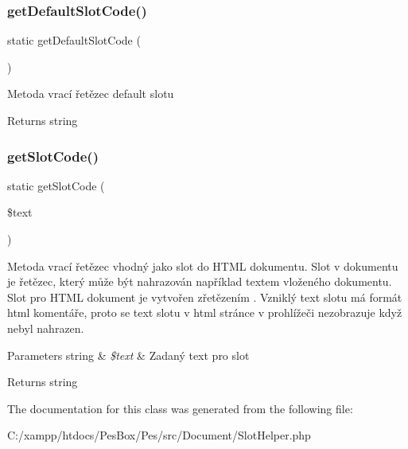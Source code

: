 \subsubsection{\texorpdfstring{get\+Default\+Slot\+Code()}{getDefaultSlotCode()}}
{\footnotesize\ttfamily static get\+Default\+Slot\+Code (\begin{DoxyParamCaption}{ }\end{DoxyParamCaption})\hspace{0.3cm}{\ttfamily [static]}}

Metoda vrací řetězec default slotu \begin{DoxyReturn}{Returns}
string 
\end{DoxyReturn}
\mbox{\label{class_pes_1_1_document_1_1_slot_helper_a6405a07adfaf197e36dd6fa9730d410d}} 
\subsubsection{\texorpdfstring{get\+Slot\+Code()}{getSlotCode()}}
{\footnotesize\ttfamily static get\+Slot\+Code (\begin{DoxyParamCaption}\item[{}]{\$text }\end{DoxyParamCaption})\hspace{0.3cm}{\ttfamily [static]}}

Metoda vrací řetězec vhodný jako slot do H\+T\+ML dokumentu. Slot v dokumentu je řetězec, který může být nahrazován například textem vloženého dokumentu. Slot pro H\+T\+ML dokument je vytvořen zřetězením \textquotesingle{}\textquotesingle{}. Vzniklý text slotu má formát html komentáře, proto se text slotu v html stránce v prohlížeči nezobrazuje když nebyl nahrazen. 
\begin{DoxyParams}[1]{Parameters}
string & {\em \$text} & Zadaný text pro slot \\
\hline
\end{DoxyParams}
\begin{DoxyReturn}{Returns}
string 
\end{DoxyReturn}


The documentation for this class was generated from the following file\+:\begin{DoxyCompactItemize}
\item 
C\+:/xampp/htdocs/\+Pes\+Box/\+Pes/src/\+Document/Slot\+Helper.\+php\end{DoxyCompactItemize}

